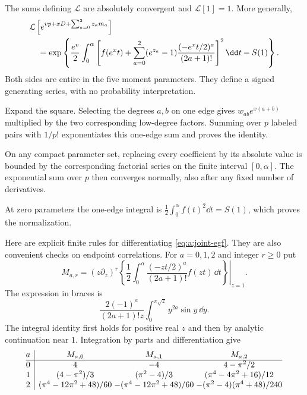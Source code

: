 \begin{lmm}\label{lmm:a:joint-moments}
The sums defining $\mathcal L$ are absolutely convergent and
$\mathcal L[1]=1$. More generally,
\begin{align}
 &\mathcal L\left[e^{vp+xD+\sum_{a=0}^2z_a m_a}\right]\notag\\
 &\quad=\exp\left\{\frac{e^v}{2}\int_0^\alpha
 \left[f(e^x t)+\sum_{a=0}^2(e^{z_a}-1)
               \frac{(-e^x t/2)^a}{(2a+1)!}\right]^2\dd t-S(1)\right\}.
 \label{eq:a:joint-egf}
\end{align}
Both sides are entire in the five moment parameters. They define a
signed generating series, with no probability interpretation.
\end{lmm}
\begin{prf}
Expand the square. Selecting the degrees $a,b$ on one edge gives
$w_{ab}e^{x(a+b)}$ multiplied by the two corresponding low-degree
factors. Summing over $p$ labeled pairs with $1/p!$ exponentiates
this one-edge sum and proves the identity.

On any compact parameter
set, replacing every coefficient by its absolute value is bounded by
the corresponding factorial series on the finite interval
$[0,\alpha]$. The exponential sum over $p$ then converges normally,
also after any fixed number of derivatives.

At zero parameters the
one-edge integral is $\tfrac12\int_0^\alpha f(t)^2\dd t=S(1)$,
which proves the normalization.
\end{prf}

Here are explicit finite rules for differentiating
\eqref{eq:a:joint-egf}. They are also convenient checks on endpoint
correlations. For $a=0,1,2$ and integer $r\geq0$ put
\begin{equation}\label{eq:a:side-moments}
 M_{a,r}=\left.(z\partial_z)^r
 \left\{\frac12\int_0^\alpha
       \frac{(-zt/2)^a}{(2a+1)!}f(zt)\,\dd t\right\}\right|_{z=1}.
\end{equation}
The expression in braces is
\[
 \frac{2(-1)^a}{(2a+1)!z}
              \int_0^{\pi\sqrt z}y^{2a}\sin y\,\dd y.
\]
The integral identity first holds for positive real $z$ and then by
analytic continuation near $1$. Integration by parts and differentiation
give
\begin{equation}\label{eq:a:side-table}
\begin{array}{@{}c|c@{\;}c@{\;}c@{}}
 a&M_{a,0}&M_{a,1}&M_{a,2}\\\hline
0&4&-4&4-\pi^2/2\\
1&(4-\pi^2)/3&(\pi^2-4)/3&(\pi^4-4\pi^2+16)/12\\
2&(\pi^4-12\pi^2+48)/60&-(\pi^4-12\pi^2+48)/60
 &-(\pi^2-4)(\pi^4+48)/240
\end{array}
\end{equation}

